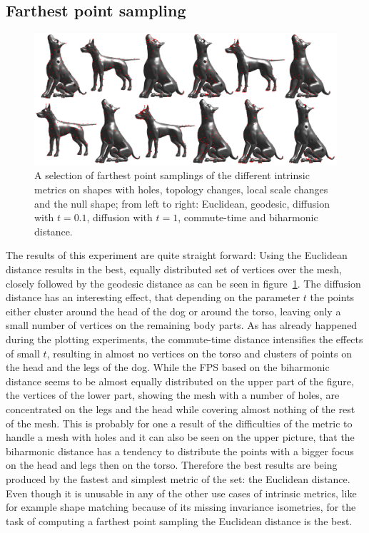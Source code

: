 \subsection{Farthest point sampling}
\begin{figure}[h]
	\centering
	\includegraphics[width = \textwidth]{../results/fps_end}
	\caption{A selection of farthest point samplings of the different intrinsic metrics on shapes with holes, topology changes, local scale changes and the null shape; from left to right: Euclidean, geodesic, diffusion with $t=0.1$, diffusion with $t=1$, commute-time and biharmonic distance.}
	\label{fig:fps_end}
\end{figure}
The results of this experiment are quite straight forward:
Using the Euclidean distance results in the best, equally distributed set of vertices over the mesh, closely followed by the geodesic distance as can be seen in figure~\ref{fig:fps_end}.
The diffusion distance has an interesting effect, that depending on the parameter $t$ the points either cluster around the head of the dog or around the torso, leaving only a small number of vertices on the remaining body parts.
As has already happened during the plotting experiments, the commute-time distance intensifies the effects of small $t$, resulting in almost no vertices on the torso and clusters of points on the head and the legs of the dog.
While the FPS based on the biharmonic distance seems to be almost equally distributed on the upper part of the figure, the vertices of the lower part, showing the mesh with a number of holes, are concentrated on the legs and the head while covering almost nothing of the rest of the mesh.
This is probably for one a result of the difficulties of the metric to handle a mesh with holes and it can also be seen on the upper picture, that the biharmonic distance has a tendency to distribute the points with a bigger focus on the head and legs then on the torso.
Therefore the best results are being produced by the fastest and simplest metric of the set: the Euclidean distance.
Even though it is unusable in any of the other use cases of intrinsic metrics, like for example shape matching because of its missing invariance isometries, for the task of computing a farthest point sampling the Euclidean distance is the best.



